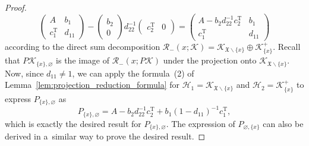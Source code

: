 \documentclass[pdftex]{sigma}
\numberwithin{equation}{section}
\newcommand{\mfrak}[1]{\mathfrak{#1}}
\newcommand{\mcal}[1]{\mathcal{#1}}
\newcommand{\mrm}[1]{\mathrm{#1}}
\begin{document}
\begin{proof}
\begin{equation*}
	\left(
	\begin{matrix}
	A & b_{1} \\
	c_{1}^{\mrm{T}} & d_{11}
	\end{matrix}
	\right)-
	\left(
	\begin{matrix}
		b_{2} \\
		0
	\end{matrix}
	\right)d_{22}^{-1}\left(
	\begin{matrix}
		c_{2}^{\mrm{T}} & 0
	\end{matrix}
	\right)=
	\left(
	\begin{matrix}
		A-b_{2}d_{22}^{-1}c_{2}^{\mrm{T}} & b_{1} \\
		c_{1}^{\mrm{T}} & d_{11}
	\end{matrix}
	\right)
\end{equation*}
according to the direct sum decomposition $\mcal{R}_{-}(x;\mcal{K})=\mcal{K}_{\mfrak{X}\backslash\{x\}}\oplus \mcal{K}_{\{x\}}^{+}$.
Recall that $P\mcal{K}_{\{x\},\varnothing}$ is the image of $\mcal{R}_{-}(x;P\mcal{K})$ under the projection onto $\mcal{K}_{\mfrak{X}\backslash\{x\}}$.
Now, since $d_{11}\neq 1$, we can apply the formula~(2) of Lemma~\ref{lem:projection_reduction_formula} for $\mcal{H}_{1}=\mcal{K}_{\mfrak{X}\backslash\{x\}}$ and $\mcal{H}_{2}=\mcal{K}_{\{x\}}^{+}$ to express $P_{\{x\},\varnothing}$ as
\begin{equation*}
	P_{\{x\},\varnothing}=A-b_{2}d_{22}^{-1}c_{2}^{\mrm{T}}+b_{1}(1-d_{11})^{-1}c_{1}^{\mrm{T}},
\end{equation*}
which is exactly the desired result for $P_{\{x\},\varnothing}$.
The expression of $P_{\varnothing,\{x\}}$ can also be derived in a~similar way to prove the desired result.
\end{proof}
\end{document}
